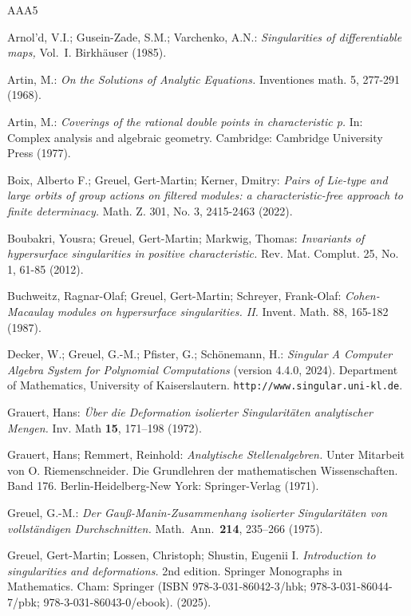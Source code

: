 \documentclass[11pt]{article}
\begin{document}
\begin{thebibliography}{AAA5}

 Arnol'd, V.I.; Gusein-Zade, S.M.; Varchenko, A.N.:
{\it Singularities of differentiable maps,\/} Vol.\ I.   Birkh\"auser (1985).

 Artin, M.:
{\it On the Solutions of Analytic Equations.} 
Inventiones math. 5, 277-291 (1968). 

  Artin, M.: {\it Coverings of the rational double points in characteristic p.} In: Complex analysis and algebraic geometry. Cambridge: Cambridge University Press (1977).

 Boix, Alberto F.; Greuel, Gert-Martin; Kerner, Dmitry:
{\it Pairs of Lie-type and large orbits of group actions on filtered modules: a characteristic-free approach to finite determinacy.} 
Math. Z. 301, No. 3, 2415-2463 (2022). 

 Boubakri, Yousra; Greuel, Gert-Martin; Markwig, Thomas:
{\it Invariants of hypersurface singularities in positive characteristic.} 
Rev. Mat. Complut. 25, No. 1, 61-85 (2012). 
 
   Buchweitz, Ragnar-Olaf; Greuel, Gert-Martin; Schreyer, Frank-Olaf:
\emph{Cohen-Macaulay modules on hypersurface singularities. II. }
Invent. Math. 88, 165-182 (1987).

    Decker, W.; Greuel, G.-M.; Pfister, G.; Sch\"onemann, H.:
{\it {\sc Singular} A Computer Algebra System for Polynomial
Computations} (version 4.4.0, 2024). Department of Mathematics, University of
Kaiserslautern. {\tt http://www.singular.uni-kl.de}.

 Grauert, Hans: {\em \"Uber die Deformation isolierter 
Singularit\"aten analytischer Mengen.} Inv. Math {\bf 15}, 171--198 (1972).

 Grauert, Hans; Remmert, Reinhold:
{\it Analytische Stellenalgebren.} Unter Mitarbeit von O. Riemenschneider.
Die Grundlehren der mathematischen Wissenschaften. Band 176. Berlin-Heidelberg-New York: Springer-Verlag (1971). 

 Greuel, G.-M.: {\it Der Gau{\ss}-Manin-Zusammenhang
  isolierter Singularit\"aten von vollst\"andigen Durchschnitten.}
  Math.\ Ann.\ {\bf 214}, 235--266 (1975).

  Greuel, Gert-Martin; Lossen, Christoph; Shustin, Eugenii I.
{\it Introduction to singularities and deformations.} 2nd edition. 
Springer Monographs in Mathematics. Cham: Springer (ISBN 978-3-031-86042-3/hbk; 978-3-031-86044-7/pbk; 978-3-031-86043-0/ebook). (2025). 


\end{thebibliography}
\end{document}

